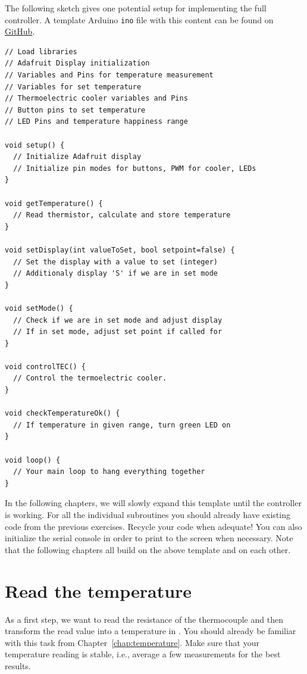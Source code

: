 The following sketch gives one potential setup for implementing the full controller. A template Arduino \texttt{ino} file with this content can be found on \href{https://github.com/galactic-forensics/workshop_arduino_electronics/blob/main/templates/full_project_template/full_project_template.ino}{GitHub}.

\begin{lstlisting}
// Load libraries
// Adafruit Display initialization
// Variables and Pins for temperature measurement
// Variables for set temperature
// Thermoelectric cooler variables and Pins
// Button pins to set temperature
// LED Pins and temperature happiness range

void setup() {
  // Initialize Adafruit display
  // Initialize pin modes for buttons, PWM for cooler, LEDs
}

void getTemperature() {
  // Read thermistor, calculate and store temperature
}

void setDisplay(int valueToSet, bool setpoint=false) {
  // Set the display with a value to set (integer)
  // Additionaly display 'S' if we are in set mode
}

void setMode() {
  // Check if we are in set mode and adjust display
  // If in set mode, adjust set point if called for
}

void controlTEC() {
  // Control the termoelectric cooler.
}

void checkTemperatureOk() {
  // If temperature in given range, turn green LED on
}

void loop() {
  // Your main loop to hang everything together
}
\end{lstlisting}
In the following chapters, we will slowly expand this template until the controller  is working. For all the individual subroutines you should already have existing code from the previous exercises. Recycle your code when adequate! You can also initialize the serial console in order to print to the screen when necessary. Note that the following chapters all build on the above template and on each other.

\section{Read the temperature}

As a first step, we want to read the resistance of the thermocouple and then transform the read value into a temperature in \celsius. You should already be familiar with this task from Chapter~\ref{chap:temperature}. Make sure that your temperature reading is stable, i.e., average a few measurements for the best results.

